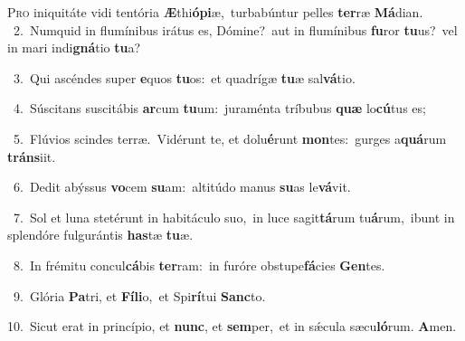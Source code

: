 \lettrine{\initial\textcolor{\initialcolor}{P}}{ro} iniquitáte vidi tentória \textbf{Æ}\-thi\-\textbf{ó}\-\textbf{pi}æ,~\star turbabúntur pelles \textbf{ter}\-ræ \textbf{Má}\-dian.\\
{\numbfont\textcolor{\numbcolor}{~2.}}~Numquid in flumínibus irátus es, Dómine?~\dagger aut in flumínibus \textbf{fu}\-ror \textbf{tu}\-us?~\star vel in mari indi\-\textbf{gná}\-tio \textbf{tu}\-a?\par
{\numbfont\textcolor{\numbcolor}{~3.}}~Qui ascéndes super \textbf{e}\-quos \textbf{tu}\-os:~\star et quadrígæ \textbf{tu}\-æ sal\-\textbf{vá}\-tio.\par
{\numbfont\textcolor{\numbcolor}{~4.}}~Súscitans suscitábis \textbf{ar}\-cum \textbf{tu}\-um:~\star juraménta tríbubus \textbf{quæ} lo\-\textbf{cú}\-tus es;\par
{\numbfont\textcolor{\numbcolor}{~5.}}~Flúvios scindes terræ.~\dagger Vidérunt te, et dolu\-\textbf{é}\-runt \textbf{mon}\-tes:~\star gurges a\-\textbf{quá}\-rum \textbf{tráns}\-iit.\par
{\numbfont\textcolor{\numbcolor}{~6.}}~Dedit abýssus \textbf{vo}\-cem \textbf{su}\-am:~\star altitúdo manus \textbf{su}\-as le\-\textbf{vá}\-vit.\par
{\numbfont\textcolor{\numbcolor}{~7.}}~Sol et luna stetérunt in habitáculo suo,~\dagger in luce sagit\-\textbf{tá}\-rum tu\-\textbf{á}\-rum,~\star ibunt in splendóre fulgurántis \textbf{has}\-tæ \textbf{tu}\-æ.\par
{\numbfont\textcolor{\numbcolor}{~8.}}~In frémitu concul\-\textbf{cá}\-bis \textbf{ter}\-ram:~\star in furóre obstupe\-\textbf{fá}\-cies \textbf{Gen}\-tes.\par
{\numbfont\textcolor{\numbcolor}{~9.}}~Glória \textbf{Pa}\-tri, et \textbf{Fí}\-\textbf{li}o,~\star et Spi\-\textbf{rí}\-tui \textbf{Sanc}\-to.\par
{\numbfont\textcolor{\numbcolor}{10.}}~Sicut erat in princípio, et \textbf{nunc}\-, et \textbf{sem}\-per,~\star et in sǽcula sæcu\-\textbf{ló}\-rum. \textbf{A}\-men.\par
